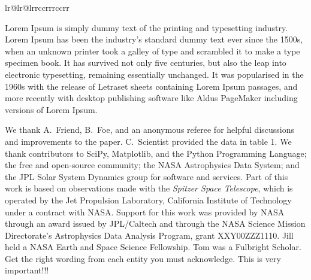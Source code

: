 \begin{deluxetable*}{lr@{}lr@{}lrrccrrrccrr}
\end{deluxetable*}


Lorem Ipsum is simply dummy text of the printing and typesetting
industry. Lorem Ipsum has been the industry's standard dummy text ever
since the 1500s, when an unknown printer took a galley of type and
scrambled it to make a type specimen book. It has survived not only
five centuries, but also the leap into electronic typesetting,
remaining essentially unchanged. It was popularised in the 1960s with
the release of Letraset sheets containing Lorem Ipsum passages, and
more recently with desktop publishing software like Aldus PageMaker
including versions of Lorem Ipsum.

\acknowledgments

We thank A.\ Friend, B.\ Foe, and an anonymous referee for helpful
discussions and improvements to the paper.  C.\ Scientist provided the
data in table 1.
We thank contributors to SciPy, Matplotlib, and the Python Programming
Language; the free and open-source community; the NASA Astrophysics
Data System; and the JPL Solar System Dynamics group for software and
services.
Part of this work is based on observations made with the
{\em Spitzer Space Telescope}, which is operated by the Jet Propulsion
Laboratory, California Institute of Technology under a contract with
NASA.
Support for this work was provided by NASA through an award
issued by JPL/Caltech and through the NASA Science Mission
Directorate's Astrophysics Data Analysis Program, grant
XXY00ZZZ1110.
Jill held a NASA Earth and Space Science Fellowship.  Tom was a
Fulbright Scholar.  Get the right wording from each entity you must
acknowledge.  This is very important!!!



